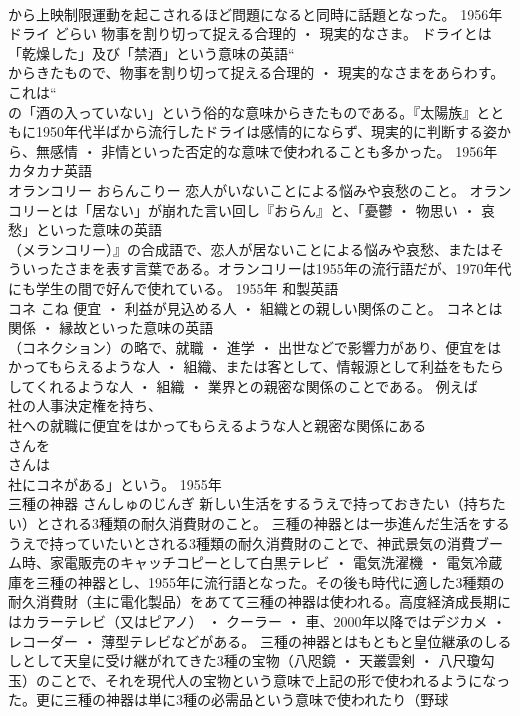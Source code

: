 \documentclass[8pt]{extreport}
\begin{document}
\begin{CJK}{UTF8}{min}
\\	から上映制限運動を起こされるほど問題になると同時に話題となった。	1956年	
\\	ドライ	どらい	物事を割り切って捉える合理的 ・ 現実的なさま。	ドライとは「乾燥した」及び「禁酒」という意味の英語“
\\	からきたもので、物事を割り切って捉える合理的 ・ 現実的なさまをあらわす。これは“
\\	の「酒の入っていない」という俗的な意味からきたものである。『太陽族』とともに1950年代半ばから流行したドライは感情的にならず、現実的に判断する姿から、無感情 ・ 非情といった否定的な意味で使われることも多かった。	1956年	カタカナ英語	
\\	オランコリー	おらんこりー	恋人がいないことによる悩みや哀愁のこと。	オランコリーとは「居ない」が崩れた言い回し『おらん』と、「憂鬱 ・ 物思い ・ 哀愁」といった意味の英語
\\	（メランコリー）』の合成語で、恋人が居ないことによる悩みや哀愁、またはそういったさまを表す言葉である。オランコリーは1955年の流行語だが、1970年代にも学生の間で好んで使れている。	1955年	和製英語	
\\	コネ	こね	便宜 ・ 利益が見込める人 ・ 組織との親しい関係のこと。	コネとは関係 ・ 縁故といった意味の英語
\\	（コネクション）の略で、就職 ・ 進学 ・ 出世などで影響力があり、便宜をはかってもらえるような人 ・ 組織、または客として、情報源として利益をもたらしてくれるような人 ・ 組織 ・ 業界との親密な関係のことである。 例えば
\\	社の人事決定権を持ち、
\\	社への就職に便宜をはかってもらえるような人と親密な関係にある
\\	さんを
\\	さんは
\\	社にコネがある」という。	1955年	
\\	三種の神器	さんしゅのじんぎ	新しい生活をするうえで持っておきたい（持ちたい）とされる3種類の耐久消費財のこと。	三種の神器とは一歩進んだ生活をするうえで持っていたいとされる3種類の耐久消費財のことで、神武景気の消費ブーム時、家電販売のキャッチコピーとして白黒テレビ ・ 電気洗濯機 ・ 電気冷蔵庫を三種の神器とし、1955年に流行語となった。その後も時代に適した3種類の耐久消費財（主に電化製品）をあてて三種の神器は使われる。高度経済成長期にはカラーテレビ（又はピアノ） ・ クーラー ・ 車、2000年以降ではデジカメ ・ 
\\	レコーダー ・ 薄型テレビなどがある。 三種の神器とはもともと皇位継承のしるしとして天皇に受け継がれてきた3種の宝物（八咫鏡 ・ 天叢雲剣 ・ 八尺瓊勾玉）のことで、それを現代人の宝物という意味で上記の形で使われるようになった。更に三種の神器は単に3種の必需品という意味で使われたり（野球

\end{CJK}
\end{document}
